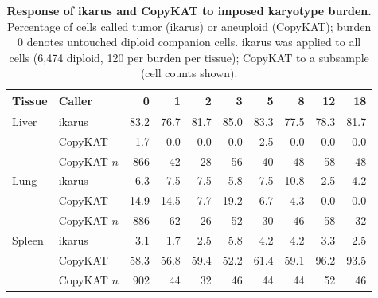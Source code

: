 \begin{table}[htbp]
\centering
\caption{\textbf{Response of ikarus and CopyKAT to imposed karyotype burden.} Percentage of cells called tumor (ikarus) or aneuploid (CopyKAT); burden 0 denotes untouched diploid companion cells. ikarus was applied to all cells (6,474 diploid, 120 per burden per tissue); CopyKAT to a subsample (cell counts shown).}
\label{tab:s3}
\scriptsize
\begin{tabular}{@{}llrrrrrrrr@{}}
\toprule
Tissue & Caller & 0 & 1 & 2 & 3 & 5 & 8 & 12 & 18 \\
\midrule
Liver & ikarus & 83.2 & 76.7 & 81.7 & 85.0 & 83.3 & 77.5 & 78.3 & 81.7 \\
 & CopyKAT & 1.7 & 0.0 & 0.0 & 0.0 & 2.5 & 0.0 & 0.0 & 0.0 \\
 & \quad CopyKAT $n$ & 866 & 42 & 28 & 56 & 40 & 48 & 58 & 48 \\
Lung & ikarus & 6.3 & 7.5 & 7.5 & 5.8 & 7.5 & 10.8 & 2.5 & 4.2 \\
 & CopyKAT & 14.9 & 14.5 & 7.7 & 19.2 & 6.7 & 4.3 & 0.0 & 0.0 \\
 & \quad CopyKAT $n$ & 886 & 62 & 26 & 52 & 30 & 46 & 58 & 32 \\
Spleen & ikarus & 3.1 & 1.7 & 2.5 & 5.8 & 4.2 & 4.2 & 3.3 & 2.5 \\
 & CopyKAT & 58.3 & 56.8 & 59.4 & 52.2 & 61.4 & 59.1 & 96.2 & 93.5 \\
 & \quad CopyKAT $n$ & 902 & 44 & 32 & 46 & 44 & 44 & 52 & 46 \\
\bottomrule
\end{tabular}
\end{table}
